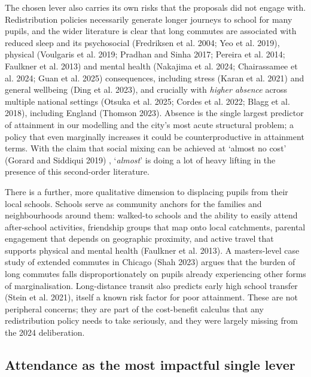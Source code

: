 \documentclass[
  12pt,
  titlepage]{article}
\begin{document}
The chosen lever also carries its own risks that the proposals did not
engage with. Redistribution policies necessarily generate longer
journeys to school for many pupils, and the wider literature is clear
that long commutes are associated with reduced sleep and its
psychosocial (Fredriksen et al. 2004; Yeo et al. 2019), physical
(Voulgaris et al. 2019; Pradhan and Sinha 2017; Pereira et al. 2014;
Faulkner et al. 2013) and mental health (Nakajima et al. 2024;
Chairassamee et al. 2024; Guan et al. 2025) consequences, including
stress (Karan et al. 2021) and general wellbeing (Ding et al. 2023), and
crucially with \emph{higher absence} across multiple national settings
(Otsuka et al. 2025; Cordes et al. 2022; Blagg et al. 2018), including
England (Thomson 2023). Absence is the single largest predictor of
attainment in our modelling and the city's most acute structural
problem; a policy that even marginally increases it could be
counterproductive in attainment terms. With the claim that social mixing
can be achieved at `almost no cost' (Gorard and Siddiqui 2019) ,
`\emph{almost}' is doing a lot of heavy lifting in the presence of this
second-order literature.

There is a further, more qualitative dimension to displacing pupils from
their local schools. Schools serve as community anchors for the families
and neighbourhoods around them: walked-to schools and the ability to
easily attend after-school activities, friendship groups that map onto
local catchments, parental engagement that depends on geographic
proximity, and active travel that supports physical and mental health
(Faulkner et al. 2013). A masters-level case study of extended commutes
in Chicago (Shah 2023) argues that the burden of long commutes falls
disproportionately on pupils already experiencing other forms of
marginalisation. Long-distance transit also predicts early high school
transfer (Stein et al. 2021), itself a known risk factor for poor
attainment. These are not peripheral concerns; they are part of the
cost-benefit calculus that any redistribution policy needs to take
seriously, and they were largely missing from the 2024 deliberation.

\subsection{Attendance as the most impactful single
lever}\label{attendance-as-the-most-impactful-single-lever}
\end{document}
